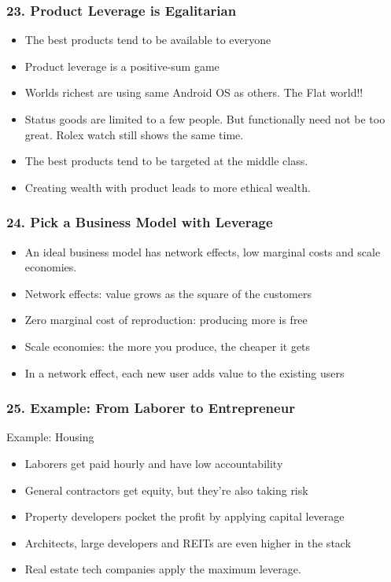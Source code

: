 \begin{frame}[fragile]
\frametitle{23. Product Leverage is Egalitarian}
\begin{itemize}
\item The best products tend to be available to everyone
\item Product leverage is a positive-sum game
\item Worlds richest are using same Android OS as others. The Flat world!!
\item Status goods are limited to a few people. But functionally need not be too great. Rolex watch still shows the same time.
\item The best products tend to be targeted at the middle class.
\item Creating wealth with product leads to more ethical wealth.
\end{itemize}
\end{frame}

\begin{frame}[fragile]
\frametitle{24. Pick a Business Model with Leverage}
\begin{itemize}
\item An ideal business model has network effects, low marginal costs and scale economies.
\item Network effects: value grows as the square of the customers
\item Zero marginal cost of reproduction: producing more is free
\item Scale economies: the more you produce, the cheaper it gets
\item In a network effect, each new user adds value to the existing users
\end{itemize}
\end{frame}

\begin{frame}[fragile]
\frametitle{25. Example: From Laborer to Entrepreneur}
Example: Housing
\begin{itemize}
\item Laborers get paid hourly and have low accountability
\item General contractors get equity, but they're also taking risk
\item Property developers pocket the profit by applying capital leverage
\item Architects, large developers and REITs are even higher in the stack
\item Real estate tech companies apply the maximum leverage.
\end{itemize}
\end{frame}

